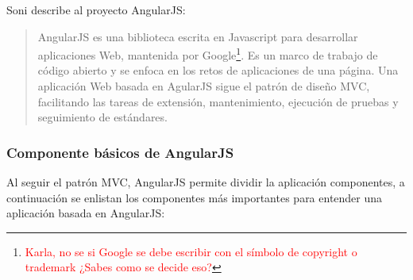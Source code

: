 Soni\cite{FullStackAngularJS} describe al proyecto AngularJS:
\begin{quote}
	AngularJS es una biblioteca escrita en Javascript para desarrollar aplicaciones Web, mantenida por Google\textsuperscript{\textcopyright}\footnote{\textcolor{red}{Karla, no se si Google se debe escribir con el símbolo de copyright \textcopyright o trademark \texttrademark ¿Sabes como se decide eso?}}. Es un marco de trabajo de código abierto y se enfoca en los retos de aplicaciones de una página. Una aplicación Web basada en AgularJS sigue el patrón de diseño MVC, facilitando las tareas de extensión, mantenimiento, ejecución de pruebas y seguimiento de estándares.
\end{quote}

\subsubsection{Componente básicos de AngularJS}
Al seguir el patrón MVC, AngularJS permite dividir la aplicación componentes, a continuación se enlistan los componentes más importantes para entender una aplicación basada en AngularJS\cite{FullStackAngularJS, LearningAngularJS, AngularJSEssentials}:
